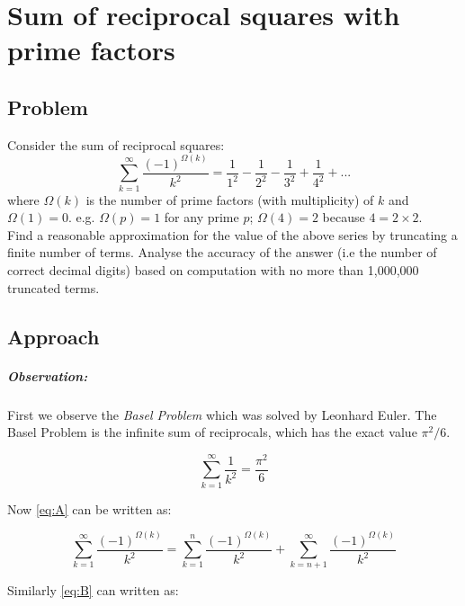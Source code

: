 \documentclass[11pt]{report}
\begin{document}
\chapter{Sum of reciprocal squares with prime factors}
\section*{Problem}
Consider the sum of reciprocal squares:
\begin{equation}
	\sum_{k=1}^{\infty} \frac{(-1)^{\Omega(k)}}{k^2} = \frac{1}{1^2} - \frac{1}{2^2} - \frac{1}{3^2} + \frac{1}{4^2} + ... \label{eq:A}
\end{equation}
where $\Omega(k)$ is the number of prime factors (with multiplicity) of $k$ and $\Omega(1) = 0$. e.g. $\Omega(p)=1$ for any prime $p$; $\Omega(4)=2$ because $4=2\times2$. \\

Find a reasonable approximation for the value of the above series by truncating a finite number of terms. Analyse the accuracy of the answer (i.e the number of correct decimal digits) based on computation with no more than 1,000,000 truncated terms. 

\section{Approach}
\paragraph{Observation:}
First we observe the \textit{Basel Problem} which was solved by Leonhard Euler. The Basel Problem is the infinite sum of reciprocals, which has the exact value $\pi^2/6$.

\begin{equation}
	\sum_{k=1}^{\infty} \frac{1}{k^2} = \frac{\pi^2}{6} \label{eq:B}
\end{equation}

Now \eqref{eq:A} can be written as:

\begin{equation*}
	\sum_{k=1}^{\infty} \frac{(-1)^{\Omega(k)}}{k^2} = \sum_{k=1}^{n} \frac{(-1)^{\Omega(k)}}{k^2} + \sum_{k=n+1}^{\infty} \frac{(-1)^{\Omega(k)}}{k^2}
\end{equation*}

Similarly \eqref{eq:B} can written as:
\end{document}
